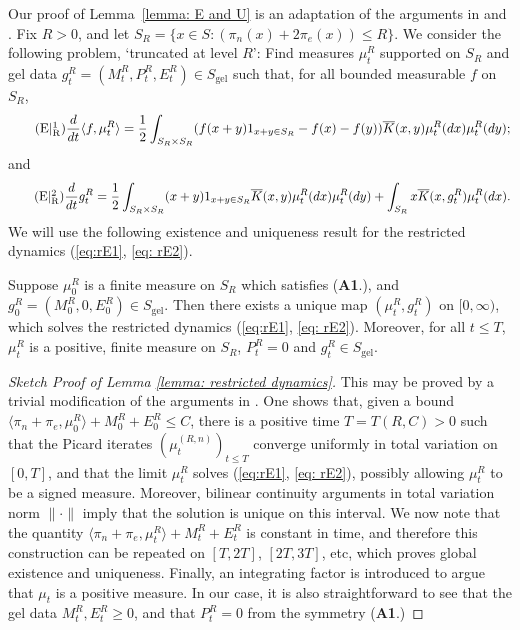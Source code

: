 Our proof of Lemma~\ref{lemma: E and U} is an adaptation of the arguments in \cite[Section 2]{N99} and \cite[Section 2]{N00}. 
Fix $R>0$, and let $S_R=\{x\in S: \left(\pi_n(x) + 2 \pi_e(x)\right) \le R\}$. We consider the following problem, `truncated at level $R$': Find measures $\mu^R_t$ supported on $S_R$ and gel data $g^R_t=(M^R_t, P^R_t, E^R_t)\in S_\mathrm{gel}$ such that, for all bounded measurable $f$ on $S_R$, \begin{equation} \tag{E$|^1_\mathrm{R}$} \label{eq:rE1} \frac{d}{dt} \langle f, \mu^R_t\rangle =\frac{1}{2}\int_{S_R\times S_R} (f(x+y)1_{x+y\in S_R}-f(x)-f(y))\overline{K}(x,y)\mu^R_t(dx)\mu^R_t(dy);\end{equation} and
\begin{equation} \label{eq: rE2} \tag{E$|^2_\mathrm{R}$}
 \frac{d}{dt}g^R_t=\frac{1}{2}\int_{S_R\times S_R} (x+y)1_{x+y\in S_R}\overline{K}(x,y)\mu^R_t(dx)\mu^R_t(dy)+\int_{S_R} x \overline{K}(x, g^R_t) \mu^R_t(dx).
\end{equation} 
We will use the following existence and uniqueness result for the restricted dynamics (\ref{eq:rE1}, \ref{eq: rE2}).
\begin{lemma}\label{lemma: restricted dynamics} Suppose $\mu^R_0$ is a finite measure on $S_R$ which satisfies (\textbf{A1}.), and $g^R_0 = (M^R_0, 0, E^R_0)\in S_\mathrm{gel}$. Then there exists a unique map $(\mu^R_t, g^R_t)$ on $[0, \infty)$, which solves the restricted dynamics (\ref{eq:rE1}, \ref{eq: rE2}). Moreover, for all $t\le T$, $\mu^R_t$ is a positive, finite measure on $S_R$, $P^R_t=0$ and $g^R_t \in S_\mathrm{gel}$. 
\end{lemma}
\begin{proof}[Sketch Proof of Lemma \ref{lemma: restricted dynamics}]This may be proved by a trivial modification of the arguments in \cite[Proposition 2.2]{N99}. One shows that, given a bound $\langle \pi_n+\pi_e, \mu^R_0\rangle +M^R_0+E^R_0\le C$, there is a positive time $T=T(R,C)>0$ such that the Picard iterates $(\mu^{(R,n)}_t)_{t\le T}$ converge uniformly in total variation on $[0,T]$, and that the limit $\mu^R_t$ solves (\ref{eq:rE1}, \ref{eq: rE2}), possibly allowing $\mu^R_t$ to be a signed measure. Moreover, bilinear continuity arguments in total variation norm $\|\cdot\|$ imply that the solution is unique on this interval. We now note that the quantity $\langle \pi_n+\pi_e, \mu^R_t\rangle +M^R_t+E^R_t$ is constant in time, and therefore this construction can be repeated on $[T, 2T]$, $[2T, 3T]$, etc, which proves global existence and uniqueness. Finally, an integrating factor is introduced to argue that $\mu_t$ is a positive measure.
In our case, it is also straightforward to see that the gel data $M^R_t, E^R_t \ge 0$, and that $P^R_t=0$ from the symmetry (\textbf{A1}.)
\end{proof}

